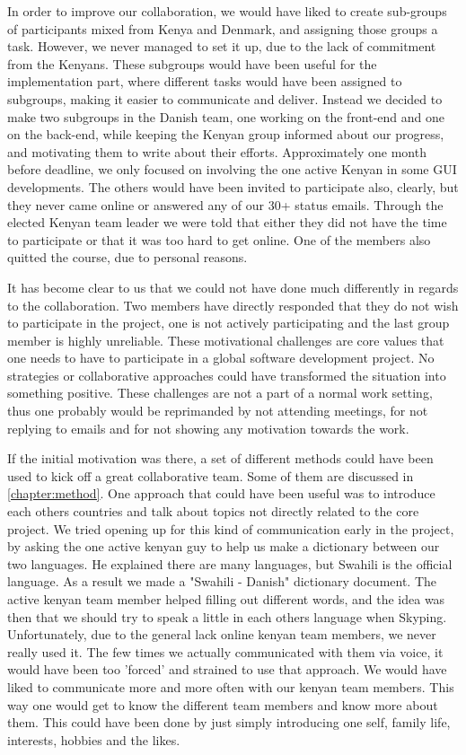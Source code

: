 In order to improve our collaboration, we would have liked to create sub-groups of participants mixed from Kenya and Denmark, and assigning those groups a task. However, we never managed to set it up, due to the lack of commitment from the Kenyans. These subgroups would have been useful for the implementation part, where different tasks would have been assigned to subgroups, making it easier to communicate and deliver. Instead we decided to make two subgroups in the Danish team, one working on the front-end and one on the back-end, while keeping the Kenyan group informed about our progress, and motivating them to write about their efforts. Approximately one month before deadline, we only focused on involving the one active Kenyan in some GUI developments. The others would have been invited to participate also, clearly, but they never came online or answered any of our 30+ status emails. Through the elected Kenyan team leader we were told that either they did not have the time to participate or that it was too hard to get online. One of the members also quitted the course, due to personal reasons. 

It has become clear to us that we could not have done much differently in regards to the collaboration. Two members have directly responded that they do not wish to participate in the project, one is not actively participating and the last group member is highly unreliable. These motivational challenges are core values that one needs to have to participate in a global software development project. No strategies or collaborative approaches could have transformed the situation into something positive. These challenges are not a part of a normal work setting, thus one probably would be reprimanded by not attending meetings, for not replying to emails and for not showing any motivation towards the work.

If the initial motivation was there, a set of different methods could have been used to kick off a great collaborative team. Some of them are discussed in \ref{chapter:method}. One approach that could have been useful was to introduce each others countries and talk about topics not directly related to the core project. We tried opening up for this kind of communication early in the project, by asking the one active kenyan guy to help us make a dictionary between our two languages. He explained there are many languages, but Swahili is the official language. As a result we made a "Swahili - Danish" dictionary document. The active kenyan team member helped filling out different words, and the idea was then that we should try to speak a little in each others language when Skyping. Unfortunately, due to the general lack online kenyan team members, we never really used it. The few times we actually communicated with them via voice, it would have been too 'forced' and strained to use that approach. We would have liked to communicate more and more often with our kenyan team members. This way one would get to know the different team members and know more about them. This could have been done by just simply introducing one self, family life, interests, hobbies and the likes.

